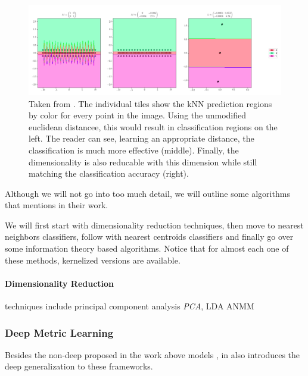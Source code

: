 \documentclass[a4paper,12pt,twoside,openright]{report}
\begin{document}
\begin{figure}[H]
	\center
  \includegraphics[width=\linewidth]{./assets/relatedwork/metric_learning_example.png}
  \caption{Taken from \cite{suarez19}. The individual tiles show the kNN prediction regions by color for every point in the image. Using the unmodified euclidean distancee, this would result in classification regions on the left. The reader can see, learning an appropriate distance, the classification is much more effective (middle). Finally, the dimensionality is also reducable with this dimension while still matching the classification accuracy (right).}
  \label{fig:BERT_vanilla_pipeline}
\end{figure}

Although we will not go into too much detail, we will outline some algorithms that \cite{suarez19} mentions in their work.

We will first start with dimensionality reduction techniques, then move to nearest neighbors classifiers, follow with nearest centroids classifiers and finally go over some information theory based algorithms.
Notice that for almost each one of these methods, kernelized versions are available.




\paragraph{Dimensionality Reduction} techniques include principal component analysis \textit{PCA}, LDA ANMM



\subsubsection{Deep Metric Learning}

Besides the non-deep proposed in the work above models , in\cite{kaya19} also introduces the deep generalization to these frameworks.
\end{document}
